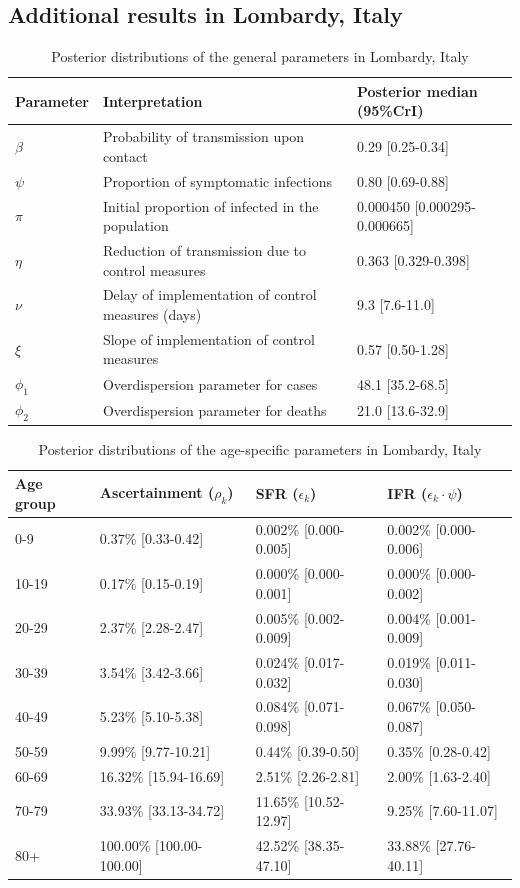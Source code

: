 \documentclass{article}
\begin{document}
\subsection{Additional results in Lombardy, Italy}
\begin{table}[H]
	\centering
	\begin{tabular}{lll}
		\hline
		Parameter & Interpretation & Posterior median (95\%CrI) \\ 
		\hline
		$\beta$ & Probability of transmission upon contact & 0.29 [0.25-0.34] \\ 
		$\psi$ & Proportion of symptomatic infections & 0.80 [0.69-0.88] \\ 
		$\pi$ & Initial proportion of infected in the population & 0.000450 [0.000295-0.000665] \\ 
		$\eta$ & Reduction of transmission due to control measures & 0.363 [0.329-0.398] \\ 
		$\nu$ & Delay of implementation of control measures (days) & 9.3 [7.6-11.0] \\ 
		$\xi$ & Slope of implementation of control measures & 0.57 [0.50-1.28] \\ 
		$\phi_1$ & Overdispersion parameter for cases & 48.1 [35.2-68.5] \\ 
		$\phi_2$ & Overdispersion parameter for deaths & 21.0 [13.6-32.9] \\ 
		\hline
	\end{tabular}
	\caption{Posterior distributions of the general parameters in Lombardy, Italy} 
\end{table}
\begin{table}[H]
	\centering
	\begin{tabular}{llll}
		\hline
		Age group & Ascertainment ($\rho_k$) & SFR ($\epsilon_k$) & IFR ($\epsilon_k\cdot\psi$) \\ 
		\hline
		0-9 & 0.37\% [0.33-0.42] & 0.002\% [0.000-0.005] & 0.002\% [0.000-0.006] \\ 
		10-19 & 0.17\% [0.15-0.19] & 0.000\% [0.000-0.001] & 0.000\% [0.000-0.002] \\ 
		20-29 & 2.37\% [2.28-2.47] & 0.005\% [0.002-0.009] & 0.004\% [0.001-0.009] \\ 
		30-39 & 3.54\% [3.42-3.66] & 0.024\% [0.017-0.032] & 0.019\% [0.011-0.030] \\ 
		40-49 & 5.23\% [5.10-5.38] & 0.084\% [0.071-0.098] & 0.067\% [0.050-0.087] \\ 
		50-59 & 9.99\% [9.77-10.21] & 0.44\% [0.39-0.50] & 0.35\% [0.28-0.42] \\ 
		60-69 & 16.32\% [15.94-16.69] & 2.51\% [2.26-2.81] & 2.00\% [1.63-2.40] \\ 
		70-79 & 33.93\% [33.13-34.72] & 11.65\% [10.52-12.97] & 9.25\% [7.60-11.07] \\ 
		80+ & 100.00\% [100.00-100.00] & 42.52\% [38.35-47.10] & 33.88\% [27.76-40.11] \\ 
		\hline
	\end{tabular}
	\caption{Posterior distributions of the age-specific parameters in Lombardy, Italy} 
\end{table}
\clearpage
\end{document}
